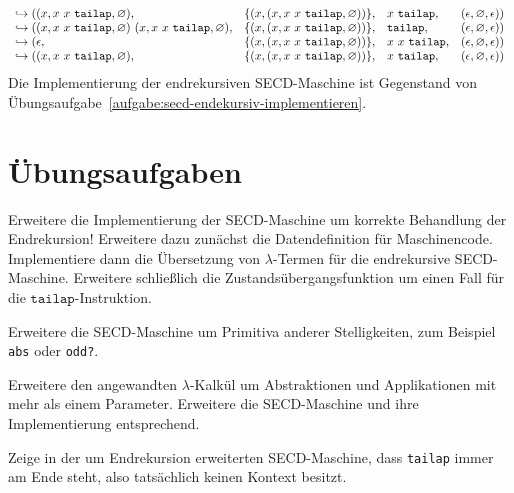 \begin{displaymath}
\begin{array}{l@{}llll}
\hookrightarrow{}&((x, x~x~\mathtt{tailap}, \varnothing), &\{(x, (x, x~x~\mathtt{tailap}, \varnothing))\}, &x~\mathtt{tailap}, &(\epsilon, \varnothing, \epsilon))\\
\hookrightarrow{}&((x, x~x~\mathtt{tailap}, \varnothing)~(x, x~x~\mathtt{tailap}, \varnothing), &\{(x, (x, x~x~\mathtt{tailap}, \varnothing))\}, &\mathtt{tailap}, &(\epsilon, \varnothing, \epsilon))\\
\hookrightarrow{}&(\epsilon, &\{(x, (x, x~x~\mathtt{tailap}, \varnothing))\}, &x~x~\mathtt{tailap}, &(\epsilon, \varnothing, \epsilon))\\
\hookrightarrow{}&((x, x~x~\mathtt{tailap}, \varnothing), &\{(x, (x, x~x~\mathtt{tailap}, \varnothing))\}, &x~\mathtt{tailap}, &(\epsilon, \varnothing, \epsilon))
 \end{array}
\end{displaymath}
Die Implementierung der endrekursiven SECD-Maschine ist Gegenstand von
Übungsaufgabe~\ref{aufgabe:secd-endekursiv-implementieren}.

\section*{Übungsaufgaben}


\begin{aufgabe}\label{aufgabe:secd-endekursiv-implementieren}
  Erweitere die Implementierung der SECD-Maschine um korrekte
  Behandlung der Endrekursion!  Erweitere dazu zunächst die
  Datendefinition für Maschinencode. Implementiere dann die
  Übersetzung von $\lambda$-Termen für die endrekursive SECD-Maschine.
  Erweitere schließlich die Zustandsübergangsfunktion um einen
  Fall für die $\mathtt{tailap}$-Instruktion.
\end{aufgabe}

\begin{aufgabe}\label{aufgabe:prim-arity}
  Erweitere die SECD-Maschine um Primitiva anderer Stelligkeiten,
  zum Beispiel \lstinline{abs} oder \lstinline{odd?}.
\end{aufgabe}

\begin{aufgabe}
  Erweitere den angewandten $\lambda$-Kalkül um Abstraktionen und
  Applikationen mit mehr als einem Parameter.  Erweitere die
  SECD-Maschine und ihre Implementierung entsprechend.
\end{aufgabe}

\begin{aufgabe}
  Zeige in der um Endrekursion erweiterten
  SECD-Maschine, dass \lstinline{tailap} immer am Ende steht, also
  tatsächlich keinen Kontext besitzt.
\end{aufgabe}

